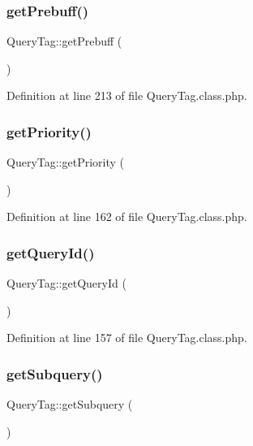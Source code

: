 \subsubsection{\texorpdfstring{get\+Prebuff()}{getPrebuff()}}
{\footnotesize\ttfamily Query\+Tag\+::get\+Prebuff (\begin{DoxyParamCaption}{ }\end{DoxyParamCaption})}



Definition at line 213 of file Query\+Tag.\+class.\+php.

\hypertarget{classQueryTag_a0c0f1e47dfb8ef88370c400235992d00}{}\label{classQueryTag_a0c0f1e47dfb8ef88370c400235992d00} 
\subsubsection{\texorpdfstring{get\+Priority()}{getPriority()}}
{\footnotesize\ttfamily Query\+Tag\+::get\+Priority (\begin{DoxyParamCaption}{ }\end{DoxyParamCaption})}



Definition at line 162 of file Query\+Tag.\+class.\+php.

\hypertarget{classQueryTag_a449bdb9218e0ea9058720e539a99268e}{}\label{classQueryTag_a449bdb9218e0ea9058720e539a99268e} 
\subsubsection{\texorpdfstring{get\+Query\+Id()}{getQueryId()}}
{\footnotesize\ttfamily Query\+Tag\+::get\+Query\+Id (\begin{DoxyParamCaption}{ }\end{DoxyParamCaption})}



Definition at line 157 of file Query\+Tag.\+class.\+php.

\hypertarget{classQueryTag_a93b8852f75ce2f6df45efe2742eb2b48}{}\label{classQueryTag_a93b8852f75ce2f6df45efe2742eb2b48} 
\subsubsection{\texorpdfstring{get\+Subquery()}{getSubquery()}}
{\footnotesize\ttfamily Query\+Tag\+::get\+Subquery (\begin{DoxyParamCaption}{ }\end{DoxyParamCaption})}



